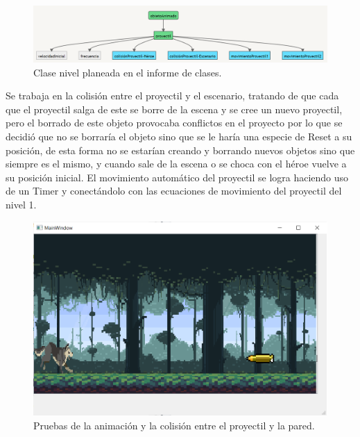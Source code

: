 \documentclass{article}
\begin{document}
\begin{figure}[h]
\includegraphics[scale=0.5]{Images/proyectil.png}
\centering
\caption{Clase nivel planeada en el informe de clases.}
\label{fig:proyectil}
\end{figure}

Se trabaja en la colisión entre el proyectil y el escenario, tratando de que cada que el proyectil salga de este se borre de la escena y se cree un nuevo proyectil, pero el borrado de este objeto provocaba conflictos en el proyecto por lo que se decidió que no se borraría el objeto sino que se le haría una especie de Reset a su posición, de esta forma no se estarían creando y borrando nuevos objetos sino que siempre es el mismo, y cuando sale de la escena o se choca con el héroe vuelve a su posición inicial.
El movimiento automático del proyectil se logra haciendo uso de un Timer y conectándolo con las ecuaciones de movimiento del proyectil del nivel 1.

\begin{figure}[h]
\includegraphics[scale=0.55]{Images/proyectil1.png}
\centering
\caption{Pruebas de la animación y la colisión entre el proyectil y la pared.}
\label{fig:proyectil1}
\end{figure}
\end{document}
